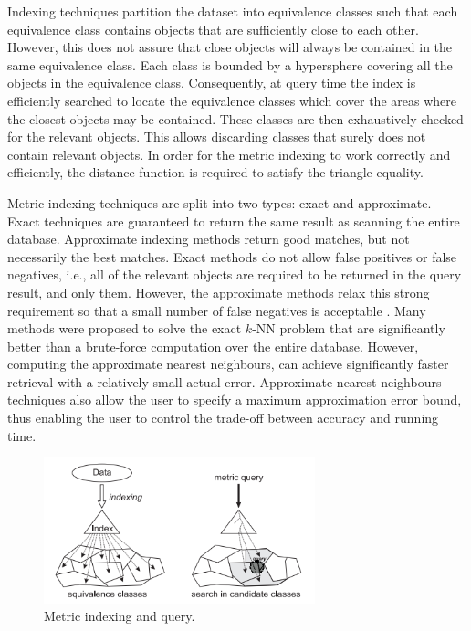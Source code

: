 \iftoggle{edit-mode}{\hspace{0pt}\marginpar{Introduction}}{}
Indexing techniques partition the dataset into equivalence classes such that each equivalence class contains objects that are sufficiently close to each other. 
However, this does not assure that close objects will always be contained in the same equivalence class. 
Each class is bounded by a hypersphere covering all the objects in the equivalence class. Consequently, at query time the index is efficiently searched to locate the equivalence classes which cover the areas where the closest objects may be contained. 
These classes are then exhaustively checked for the relevant objects.
This allows discarding classes that surely does not contain relevant objects. 
In order for the metric indexing to work correctly and efficiently, the distance function is required to satisfy the triangle equality.
 
\iftoggle{edit-mode}{\hspace{0pt}\marginpar{Exact vs. Approximate Indexing}}{}
Metric indexing techniques are split into two types: exact and approximate. 
Exact techniques are guaranteed to return the same result as  scanning the entire database. 
Approximate indexing methods return good matches, but not necessarily the best matches. 
Exact methods do not allow false positives or false negatives, i.e., all of the relevant objects are required to be returned in the query result, and only them. 
However, the approximate methods relax this strong requirement so that a small number of false negatives is acceptable \cite{keogh2005exact}. 
Many methods were proposed to solve the exact $k$-NN problem that are significantly better than a brute-force computation over the entire database. 
However, computing the approximate nearest neighbours, can achieve significantly faster retrieval with a relatively small actual error. 
Approximate nearest neighbours techniques also allow the user to specify a maximum approximation error bound, thus enabling the user to control the trade-off between accuracy and running time.

\begin{figure}
\centering
\includegraphics[width=0.7\textwidth]{./figures/indexing}       
\caption{Metric indexing and query.}
\label{fig:indexing}
\end{figure}

